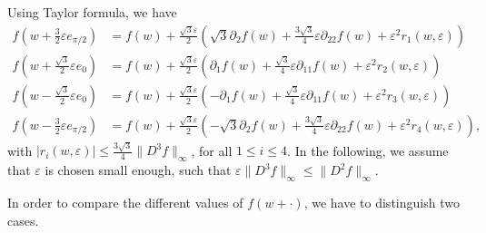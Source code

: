 \documentclass[10pt]{amsart}
\theoremstyle{definition}\newtheorem{defi}[theo]{Definition}\newtheorem{rema}[theo]{Remark}\newtheorem{exam}[theo]{Example}\newtheorem{exem}[theo]{Example}\newtheorem{nota}[theo]{Notation}
\newcommand{\eps}{\varepsilon}
\begin{document}
Using Taylor formula, we have
\begin{align*}
f\left(w+\frac{3}{2}\eps e_{\pi/2}\right)&=f(w)+\frac{\sqrt{3}\eps}{2}\left(\sqrt{3}\partial_2 f(w)+\frac{3\sqrt{3}}{4}\eps\partial_{22} f(w)+\eps^2r_1(w,\eps)\right)\\
f\left(w+\frac{\sqrt{3}}{2}\eps e_{0}\right)&=f(w)+\frac{\sqrt{3}\eps}{2}\left(\partial_1 f(w)+\frac{\sqrt{3}}{4}\eps \partial_{11} f(w)+\eps^2r_2(w,\eps)\right)\\
f\left(w-\frac{\sqrt{3}}{2}\eps e_{0}\right)&=f(w)+\frac{\sqrt{3}\eps}{2}\left(-\partial_1 f(w)+\frac{\sqrt{3}}{4}\eps\partial_{11} f(w)+\eps^2r_3(w,\eps)\right)\\
f\left(w-\frac{3}{2}\eps e_{\pi/2}\right)&=f(w)+\frac{\sqrt{3}\eps}{2}\left(-\sqrt{3}\partial_2 f(w)+\frac{3\sqrt{3}}{4}\eps\partial_{22} f(w)+\eps^2 r_4(w,\eps)\right),
\end{align*}
with $|r_i(w,\eps)|\le \frac{3\sqrt{3}}{4}\|D^3 f\|_\infty$, for all $1\le i\le 4$. In the following, we assume that $\eps$ is chosen small enough, such that $\eps \|D^3 f\|_\infty\le \|D^2 f\|_\infty$.


In order to compare the different values of $f(w+ \cdot)$, we have to distinguish two cases.
\end{document}

